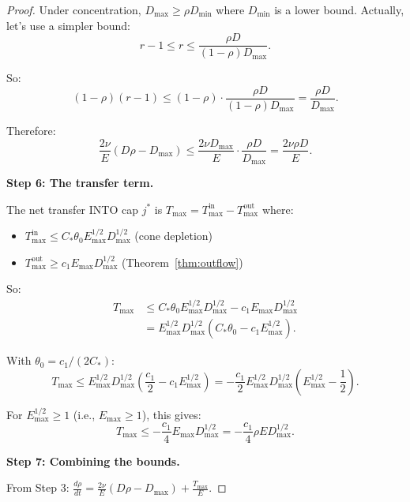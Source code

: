 \documentclass[11pt]{article}
\theoremstyle{definition}
\begin{document}
\begin{proof}
Under concentration, $D_{\max} \geq \rho D_{\min}$ where $D_{\min}$ is a lower bound. Actually, let's use a simpler bound:
\begin{equation}
r - 1 \leq r \leq \frac{\rho D}{(1-\rho) D_{\max}}.
\end{equation}

So:
\begin{equation}
(1-\rho)(r-1) \leq (1-\rho) \cdot \frac{\rho D}{(1-\rho) D_{\max}} = \frac{\rho D}{D_{\max}}.
\end{equation}

Therefore:
\begin{equation}
\frac{2\nu}{E}(D\rho - D_{\max}) \leq \frac{2\nu D_{\max}}{E} \cdot \frac{\rho D}{D_{\max}} = \frac{2\nu \rho D}{E}.
\end{equation}

\textbf{Step 6: The transfer term.}

The net transfer INTO cap $j^*$ is $T_{\max} = T_{\max}^{\text{in}} - T_{\max}^{\text{out}}$ where:
\begin{itemize}
\item $T_{\max}^{\text{in}} \leq C_* \theta_0 E_{\max}^{1/2} D_{\max}^{1/2}$ (cone depletion)
\item $T_{\max}^{\text{out}} \geq c_1 E_{\max} D_{\max}^{1/2}$ (Theorem~\ref{thm:outflow})
\end{itemize}

So:
\begin{align}
T_{\max} &\leq C_* \theta_0 E_{\max}^{1/2} D_{\max}^{1/2} - c_1 E_{\max} D_{\max}^{1/2} \\
&= E_{\max}^{1/2} D_{\max}^{1/2} \left( C_* \theta_0 - c_1 E_{\max}^{1/2} \right).
\end{align}

With $\theta_0 = c_1/(2C_*)$:
\begin{equation}
T_{\max} \leq E_{\max}^{1/2} D_{\max}^{1/2} \left( \frac{c_1}{2} - c_1 E_{\max}^{1/2} \right) = -\frac{c_1}{2} E_{\max}^{1/2} D_{\max}^{1/2} \left( E_{\max}^{1/2} - \frac{1}{2} \right).
\end{equation}

For $E_{\max}^{1/2} \geq 1$ (i.e., $E_{\max} \geq 1$), this gives:
\begin{equation}
T_{\max} \leq -\frac{c_1}{4} E_{\max} D_{\max}^{1/2} = -\frac{c_1}{4} \rho E D_{\max}^{1/2}.
\end{equation}

\textbf{Step 7: Combining the bounds.}

From Step 3: $\displaystyle \frac{d\rho}{dt} = \frac{2\nu}{E}(D\rho - D_{\max}) + \frac{T_{\max}}{E}$.


\end{proof}
\end{document}
